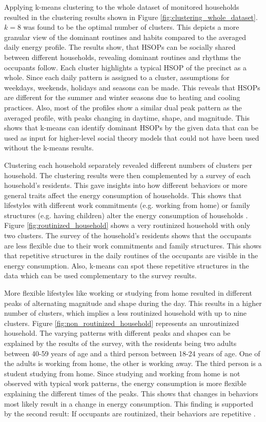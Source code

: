 Applying k-means clustering to the whole dataset of monitored households resulted in the clustering results shown in Figure \ref{fig:clustering_whole_dataset}.
$k=8$ was found to be the optimal number of clusters.
This depicts a more granular view of the dominant routines and habits compared to the averaged daily energy profile.
The results show, that HSOPs can be socially shared between different households, revealing dominant routines and rhythms the occupants follow.
Each cluster highlights a typical HSOP of the precinct as a whole.
Since each daily pattern is assigned to a cluster, assumptions for weekdays, weekends, holidays and seasons can be made. 
This reveals that HSOPs are different for the summer and winter seasons due to heating and cooling practices.
Also, most of the profiles show a similar dual peak pattern as the averaged profile, with peaks changing in daytime, shape, and magnitude.
This shows that k-means can identify dominant HSOPs by the given data that can be used as input for higher-level social theory models that could not have been used without the k-means results.

Clustering each household separately revealed different numbers of clusters per household.
The clustering results were then complemented by a survey of each household's residents.
This gave insights into how different behaviors or more general traits affect the energy consumption of households.
This shows that lifestyles with different work commitments (e.g. working from home) or family structures (e.g. having children) alter the energy consumption of households \cite{KUR-HBP}.
Figure \ref{fig:routinized_household} shows a very routinized household with only two clusters.
The survey of the household's residents shows that the occupants are less flexible due to their work commitments and family structures.
This shows that repetitive structures in the daily routines of the occupants are visible in the energy consumption.
Also, k-means can spot these repetitive structures in the data which can be used complementary to the survey results.

More flexible lifestyles like working or studying from home resulted in different peaks of alternating magnitude and shape during the day.
This results in a higher number of clusters, which implies a less routinized household with up to nine clusters.
Figure \ref{fig:non_routinized_household} represents an unroutinized household.
The varying patterns with different peaks and shapes can be explained by the results of the survey, with the residents being two adults between 40-59 years of age and a third person between 18-24 years of age.
One of the adults is working from home, the other is working away.
The third person is a student studying from home.
Since studying and working from home is not observed with typical work patterns, the energy consumption is more flexible explaining the different times of the peaks.
This shows that changes in behaviors most likely result in a change in energy consumption.
This finding is supported by the second result: If occupants are routinized, their behaviors are repetitive \cite{BRE-EWP}.

